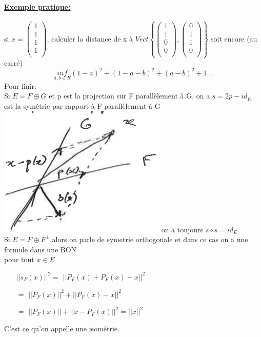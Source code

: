 \documentclass{article}
\begin{document}
\paragraph{\underline{Exemple pratique:}} si $x = \begin{pmatrix}
    1\\
    1\\
    1\\
    1\\
\end{pmatrix}$, calculer la distance de x à $Vect\left\{
    \begin{pmatrix}
        1\\
        1\\
        0\\
        0\\
    \end{pmatrix}, \begin{pmatrix}
        0\\
        1\\
        1\\
        0\\
    \end{pmatrix}
\right\}$ soit encore (au carré)
$$\underset{a,b \in R}{inf} (1 - a)^2 + (1 - a - b)^2 + (a - b)^2 + 1 \dots $$
Pour finir:\\
Si $E = F \oplus G$ et p est la projection sur F parallèlement à G, on a $s = 2p - id_E$ est la symétrie par rapport à F parallèlement à G\\
\includegraphics{images/image01.png} on a toujours $s \circ s = id_E$\\
Si $E = F \oplus F^\perp$ alors on parle de symetrie orthogonale et dans ce cas on a une formule dans une BON\\
pour tout $x \in E$



\begin{center}
    \begin{minipage}{0.50\textwidth}
        \begin{itemize}
            \item[$||s_F(x)||^2 =$]  $||P_F(x) + P_F(x) - x||^2$ 
            \item[$=$]  $||P_F(x)||^2 + ||P_F(x) - x||^2$ 
            \item[$=$]  $||P_F(x)|| + ||x - P_F(x)||^2 = ||x||^2$ 
        \end{itemize}
    \end{minipage}
\end{center}
C'est ce qu'on appelle une isométrie.
\end{document}
